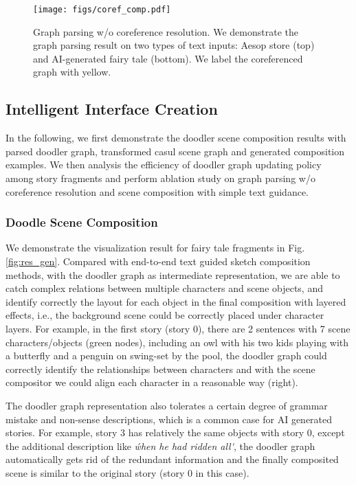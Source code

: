 \begin{figure}[!thb]
\begin{center}
   \texttt{[image: figs/coref\_comp.pdf]}
\end{center}
\caption{Graph parsing w/o coreference resolution. We demonstrate the graph parsing result on two types of text inputs: Aesop store (top) and AI-generated fairy tale (bottom). We label the coreferenced graph with yellow.}
\label{fig:coref_comp}
\end{figure}

\subsection{Intelligent Interface Creation} 
\label{sec:interface-creation}

In the following, we first demonstrate the doodler scene composition results with parsed doodler graph, transformed casul scene graph and generated composition examples. We then analysis the efficiency of doodler graph updating policy among story fragments and perform ablation study on graph parsing w/o coreference resolution and scene composition with simple text guidance.

\subsubsection{Doodle Scene Composition}

We demonstrate the visualization result for fairy tale fragments in Fig. \ref{fig:res_gen}. Compared with end-to-end text guided sketch composition methods\cite{Huang2019}, with the doodler graph as intermediate representation, we are able to catch complex relations between multiple characters and scene objects, and identify correctly the layout for each object in the final composition with layered effects, i.e., the background scene could be correctly placed under character layers. For example, in the first story (story 0), there are 2 sentences with 7 scene characters/objects (green nodes), including an owl with his two kids playing with a butterfly and a penguin on swing-set by the pool, the doodler graph could correctly identify the relationships between characters and with the scene compositor we could align each character in a reasonable way (right). 

The doodler graph representation also tolerates a certain degree of grammar mistake and non-sense descriptions, which is a common case for AI generated stories. For example, story 3 has relatively the same objects with story 0, except the additional description like \textit{\'when he had ridden all\'}, the doodler graph automatically gets rid of the redundant information and the finally composited scene is similar to the original story (story 0 in this case). 


